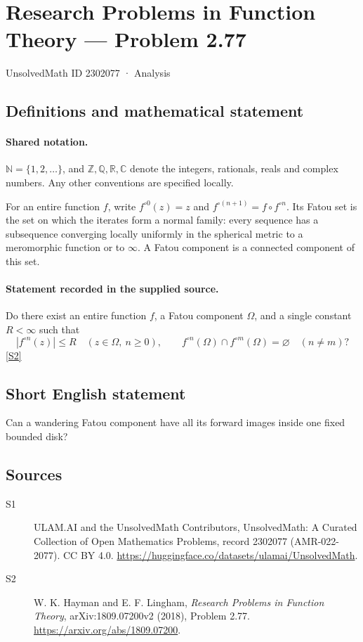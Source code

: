 \documentclass[11pt]{article}
\newcommand{\sref}[2]{\hyperlink{source:#1:#2}{[S#2]}}
\begin{document}
\setcounter{section}{2302076}
\section{Research Problems in Function Theory — Problem 2.77}\label{2302077}
{\small\sffamily UnsolvedMath ID 2302077 · Analysis}
\subsection{Definitions and mathematical statement}

\paragraph{Shared notation.}$\mathbb N=\{1,2,\ldots\}$, and $\mathbb Z,\mathbb Q,\mathbb R,\mathbb C$ denote the integers, rationals, reals and complex numbers. Any other conventions are specified locally.


For an entire function $f$, write $f^{\circ0}(z)=z$ and $f^{\circ(n+1)}=f\circ f^{\circ n}$. Its Fatou set is the set on which the iterates form a normal family: every sequence has a subsequence converging locally uniformly in the spherical metric to a meromorphic function or to $\infty$. A Fatou component is a connected component of this set.
\paragraph{Statement recorded in the supplied source.}
Do there exist an entire function $f$, a Fatou component $\Omega$, and a single constant $R<\infty$ such that
\[|f^{\circ n}(z)|\leq R\quad(z\in\Omega,\ n\geq0),\qquad
f^{\circ n}(\Omega)\cap f^{\circ m}(\Omega)=\varnothing\quad(n\ne m)?\] \sref{2302077}{2}
\subsection{Short English statement}
Can a wandering Fatou component have all its forward images inside one fixed bounded disk?
\subsection{Sources}
\begin{description}
\item[\hypertarget{source:2302077:1}{S1}] ULAM.AI and the UnsolvedMath Contributors, UnsolvedMath: A Curated Collection of Open Mathematics Problems, record 2302077 (AMR-022-2077). CC BY 4.0. \url{https://huggingface.co/datasets/ulamai/UnsolvedMath}.
\item[\hypertarget{source:2302077:2}{S2}] W. K. Hayman and E. F. Lingham, \emph{Research Problems in Function Theory}, arXiv:1809.07200v2 (2018), Problem 2.77. \url{https://arxiv.org/abs/1809.07200}.
\end{description}
\label{end:2302077}
\end{document}
